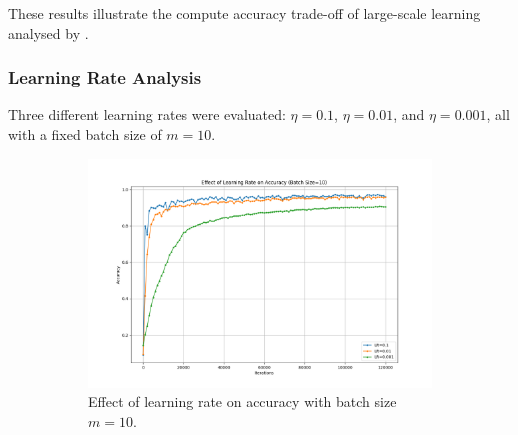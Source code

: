 \documentclass{article}
\begin{document}
\noindent These results illustrate the compute accuracy trade-off of large-scale learning 
analysed by \cite{bottou2008tradeoffs}.

\subsubsection{Learning Rate Analysis}
Three different learning rates were evaluated: $\eta=0.1$, $\eta=0.01$, and $\eta=0.001$, all with a fixed batch size of $m=10$.



\begin{figure}[H]
    \centering
    \begin{subfigure}[t]{0.48\textwidth}
        \vspace{0pt}%
        \centering
        \includegraphics[width=1.15\textwidth]{plots/part2a_learning_rate_accuracy.png}
        \caption{Effect of learning rate on accuracy with batch size $m=10$.}
        \label{fig:learning_rate_accuracy}
    \end{subfigure}
    \hfill
    \begin{subfigure}[t]{0.48\textwidth}
        \vspace{0pt}%


\end{subfigure}
\end{figure}
\end{document}
